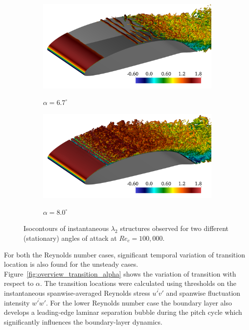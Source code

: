 \begin{figure}[t]
	\begin{subfigure}[b]{0.49\textwidth}
		\centering
		\caption{$\alpha=6.7^{\circ}$}		
		\includegraphics[width=1\textwidth]{paper3/imgs/re100k_static67_0001}
		\label{fig:overview_aoa67_iso}
	\end{subfigure}
	\begin{subfigure}[b]{0.49\textwidth}
		\centering
		\caption{$\alpha=8.0^{\circ}$}		
		\includegraphics[width=1\textwidth]{paper3/imgs/re100k_static80_0001}
		\label{fig:overview_aoa80_iso}
	\end{subfigure}
	\caption{Isocontours of instantaneous $\lambda_{2}$ structures observed for two different (stationary) angles of attack at $Re_{c}=100,000$.}
	\label{fig:overview_isocontour_aoa}
\end{figure}

For both the Reynolds number cases, significant temporal variation of transition location is also found for the unsteady cases. Figure~\ref{fig:overview_transition_alpha} shows the variation of transition with respect to $\alpha$. The transition locations were calculated using thresholds on the instantaneous spanwise-averaged Reynolds stress $\overline{u'v'}$ and spanwise fluctuation intensity $\overline{w'w'}$. For the lower Reynolds number case the boundary layer also develops a leading-edge laminar separation bubble during the pitch cycle which significantly influences the boundary-layer dynamics.

